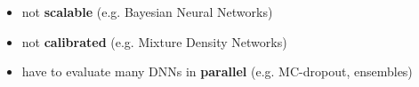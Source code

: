 \documentclass[preview]{standalone}
\newcommand{\xmark}{\ding{55}}%
\begin{document}
\begin{center}
\selectfont
        \begin{itemize} 
        \begin{itemize} 
        \item[\xmark] not \textbf{scalable} (e.g. Bayesian Neural Networks)
        \item[\xmark] not \textbf{calibrated} (e.g. Mixture Density Networks)
        \item[\xmark] have to evaluate many DNNs in \textbf{parallel} (e.g. MC-dropout, ensembles)
         \end{itemize} \end{itemize}
\end{center}
\end{document}
